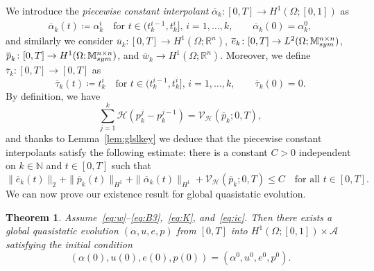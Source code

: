 \documentclass[reqno]{amsart}
\newtheorem{theorem}[corollary]{Theorem}
\theoremstyle{definition}
\numberwithin{equation}{section}
\def\R {\mathbb R}
\def\N {\mathbb N}
\def\M {\mathbb M^{n\times n}_{\rm sym}}
\begin{document}
We introduce the {\it piecewise constant interpolant} $\overline \alpha_k\colon [0,T]\to H^1(\Omega;[0,1])$ as
\begin{align}\label{eq:overline_ak}
\overline \alpha_k(t)\coloneqq\alpha_k^i\quad\text{for $t\in (t_k^{i-1},t_k^i]$, $i=1,\dots,k$},\qquad \overline \alpha_k(0)=\alpha_k^0,
\end{align}
and similarly we consider $\overline u_k\colon [0,T]\to H^1(\Omega;\R^n)$, $\overline e_k\colon [0,T]\to L^2(\Omega;\M)$, $\overline p_k\colon [0,T]\to H^1(\Omega;\M)$, and $\overline w_k\to H^1(\Omega;\R^n)$. Moreover, we define $\overline \tau_k\colon[0,T]\to [0,T]$ as 
\begin{equation}\label{eq:overline_tauk}
\overline\tau_k(t)\coloneqq t_k^i\quad\text{for $t\in (t_k^{i-1},t_k^i]$, $i=1,\dots,k$},\qquad \overline\tau_k(0)=0.
\end{equation}
By definition, we have
$$\sum_{j=1}^k\mathcal H(p_k^j-p_k^{j-1})=\mathcal V_{\mathcal H}(\overline p_k;0,T),$$
and thanks to Lemma~\ref{lem:glslkey} we deduce that the piecewise constant interpolants satisfy the following estimate: there is a constant $C>0$ independent on $k\in\N$ and $t\in[0,T]$ such that 
\begin{equation}\label{eq:k_unif_bound_gl}
\|\overline e_k(t)\|_2+\|\overline p_k(t)\|_{H^1}+\|\overline \alpha_k(t)\|_{H^1}+\mathcal V_{\mathcal H}(\overline p_k;0,T)\le C\quad\text{for all $t\in[0,T]$}.
\end{equation}
We can now prove our existence result for global quasistatic evolution.

\begin{theorem}\label{thm:glob_qe}
Assume~\eqref{eq:w}--\eqref{eq:B3},~\eqref{eq:K}, and~\eqref{eq:ic}. Then there exists a global quasistatic evolution $(\alpha,u, e, p)$ from $[0,T]$ into $H^1(\Omega;[0,1])\times\mathcal A$ satisfying the initial condition 
\begin{equation}\label{eq:initial}
(\alpha(0),u(0), e(0), p(0))=(\alpha^0,u^0,e^0,p^0).    
\end{equation}
\end{theorem}
\end{document}

